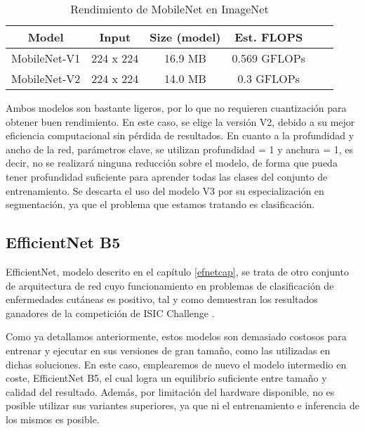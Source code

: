 \begin{table}[!ht]
	\centering
	\begin{tabular}{|c|c|c|c|c|c|}
		\hline
		\textbf{Model} & \textbf{Input} & \textbf{Size (model)} & \textbf{Est. FLOPS}  \\ \hline
		MobileNet-V1 & 224 x 224 & 16.9 MB & 0.569 GFLOPs \\ \hline
		MobileNet-V2 & 224 x 224 & 14.0 MB & 0.3 GFLOPs	  \\ \hline
	\end{tabular}
		\caption{Rendimiento de MobileNet en ImageNet \cite{mobilespecs}}
\end{table}

Ambos modelos son bastante ligeros, por lo que no requieren cuantización para obtener buen rendimiento. En este caso, se elige la versión V2, debido a su mejor eficiencia computacional sin pérdida de resultados. En cuanto a la profundidad y ancho de la red, parámetros clave, se utilizan profundidad = 1 y anchura = 1, es decir, no se realizará ninguna reducción sobre el modelo, de forma que pueda tener profundidad suficiente para aprender todas las clases del conjunto de entrenamiento. Se descarta el uso del modelo V3 por su especialización en segmentación, ya que el problema que estamos tratando es clasificación.

\subsection{EfficientNet B5}

EfficientNet, modelo descrito en el capítulo \ref{efnetcap},  se trata de otro conjunto de arquitectura de red cuyo funcionamiento en problemas de clasificación de enfermedades cutáneas es positivo, tal y como demuestran los resultados ganadores de la competición de ISIC Challenge \cite{1stISIC, 2ndISIC}.

Como ya detallamos anteriormente, estos modelos son demasiado costosos para entrenar y ejecutar en sus versiones de gran tamaño, como las utilizadas en dichas soluciones. En este caso, emplearemos de nuevo el modelo intermedio en coste, EfficientNet B5, el cual logra un equilibrio suficiente entre tamaño y calidad del resultado. Además, por limitación del hardware disponible, no es posible utilizar sus variantes superiores, ya que ni el entrenamiento e inferencia de los mismos es posible.

